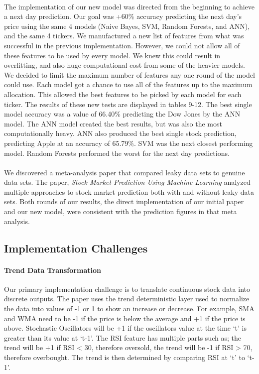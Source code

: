 \documentclass[11pt]{article}
\begin{document}
			\paragraph{} The implementation of our new model was directed from the beginning to achieve a next day prediction. Our goal was +60\% accuracy predicting the next day's price using the same 4 models (Naive Bayes, SVM, Random Forests, and ANN), and the same 4 tickers. We manufactured a new list of features from what was successful in the previous implementation. However, we could not allow all of these features to be used by every model. We knew this could result in overfitting, and also huge computational cost from some of the heavier models. We decided to limit the maximum number of features any one round of the model could use. Each model got a chance to use all of the features up to the maximum allocation. This allowed the best features to be picked by each model for each ticker. The results of these new tests are displayed in tables 9-12. The best single model accuracy was a value of 66.40\% predicting the Dow Jones by the ANN model. The ANN model created the best results, but was also the most computationally heavy. ANN also produced the best single stock prediction, predicting Apple at an accuracy of 65.79\%. SVM was the next closest performing model. Random Forests performed the worst for the next day predictions.
			
			\paragraph{} We discovered a meta-analysis paper that compared leaky data sets to genuine data sets. The paper, \textit{Stock Market Prediction Using Machine Learning} analyzed multiple approaches to stock market prediction both with and without leaky data sets. Both rounds of our results, the direct implementation of our initial paper and our new model, were consistent with the prediction figures in that meta analysis.
	
		\subsection{Implementation Challenges}
		
		\paragraph{Trend Data Transformation} Our primary implementation challenge is to translate continuous stock data into discrete outputs. The paper uses the trend deterministic layer used to normalize the data into values of -1 or 1 to show an increase or decrease. For example, SMA and WMA need to be -1 if the price is below the average and +1 if the price is above. Stochastic Oscillators will be +1 if the oscillators value at the time ‘t’ is greater than its value at ‘t-1’. The RSI feature has multiple parts such as; the trend will be +1 if RSI < 30, therefore oversold, the trend will be -1 if RSI > 70, therefore overbought. The trend is then determined by comparing RSI at ‘t’ to ‘t-1’.
	
\end{document}
